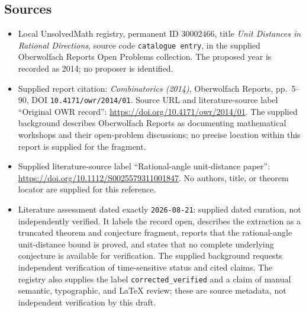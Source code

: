 \documentclass[11pt]{article}
\begin{document}
\subsection{Sources}
\begin{itemize}
\item Local UnsolvedMath registry, permanent ID \(30002466\), title \emph{Unit Distances in Rational Directions}, source code \texttt{catalogue entry}, in the supplied Oberwolfach Reports Open Problems collection. The proposed year is recorded as 2014; no proposer is identified.
\item Supplied report citation: \emph{Combinatorics (2014)}, Oberwolfach Reports, pp.\ 5--90, DOI \texttt{10.4171/owr/2014/01}. Source URL and literature-source label ``Original OWR record'': \url{https://doi.org/10.4171/owr/2014/01}. The supplied background describes Oberwolfach Reports as documenting mathematical workshops and their open-problem discussions; no precise location within this report is supplied for the fragment.
\item Supplied literature-source label ``Rational-angle unit-distance paper'': \url{https://doi.org/10.1112/S0025579311001847}. No authors, title, or theorem locator are supplied for this reference.
\item Literature assessment dated exactly \texttt{2026-08-21}: supplied dated curation, not independently verified. It labels the record open, describes the extraction as a truncated theorem and conjecture fragment, reports that the rational-angle unit-distance bound is proved, and states that no complete underlying conjecture is available for verification. The supplied background requests independent verification of time-sensitive status and cited claims. The registry also supplies the label \texttt{corrected\_verified} and a claim of manual semantic, typographic, and LaTeX review; these are source metadata, not independent verification by this draft.
\end{itemize}
\end{document}
